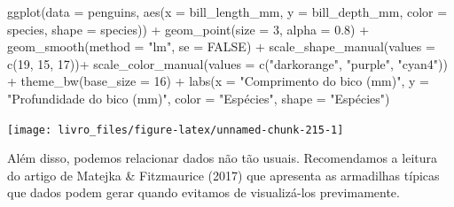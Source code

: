 \documentclass[
]{book}
\newenvironment{Shaded}{\begin{snugshade}}{\end{snugshade}}
\newcommand{\AttributeTok}[1]{\textcolor[rgb]{0.61,0.61,0.61}{#1}}
\newcommand{\ConstantTok}[1]{\textcolor[rgb]{0,0,0}{#1}}
\newcommand{\DecValTok}[1]{\textcolor[rgb]{0.06,0.06,0.06}{#1}}
\newcommand{\FloatTok}[1]{\textcolor[rgb]{0.06,0.06,0.06}{#1}}
\newcommand{\FunctionTok}[1]{\textcolor[rgb]{0,0,0}{#1}}
\newcommand{\NormalTok}[1]{#1}
\newcommand{\SpecialCharTok}[1]{\textcolor[rgb]{0,0,0}{#1}}
\newcommand{\StringTok}[1]{\textcolor[rgb]{0.5,0.5,0.5}{#1}}
\begin{document}
\begin{Shaded}
\begin{Highlighting}[]

\FunctionTok{ggplot}\NormalTok{(}\AttributeTok{data =}\NormalTok{ penguins, }
       \FunctionTok{aes}\NormalTok{(}\AttributeTok{x =}\NormalTok{ bill\_length\_mm, }
           \AttributeTok{y =}\NormalTok{ bill\_depth\_mm,}
           \AttributeTok{color =}\NormalTok{ species,}
           \AttributeTok{shape =}\NormalTok{ species)) }\SpecialCharTok{+}
  \FunctionTok{geom\_point}\NormalTok{(}\AttributeTok{size =} \DecValTok{3}\NormalTok{, }
             \AttributeTok{alpha =} \FloatTok{0.8}\NormalTok{) }\SpecialCharTok{+}
  \FunctionTok{geom\_smooth}\NormalTok{(}\AttributeTok{method =} \StringTok{"lm"}\NormalTok{, }\AttributeTok{se =} \ConstantTok{FALSE}\NormalTok{) }\SpecialCharTok{+}
  \FunctionTok{scale\_shape\_manual}\NormalTok{(}\AttributeTok{values =} \FunctionTok{c}\NormalTok{(}\DecValTok{19}\NormalTok{, }\DecValTok{15}\NormalTok{, }\DecValTok{17}\NormalTok{))}\SpecialCharTok{+}
  \FunctionTok{scale\_color\_manual}\NormalTok{(}\AttributeTok{values =} \FunctionTok{c}\NormalTok{(}\StringTok{"darkorange"}\NormalTok{, }\StringTok{"purple"}\NormalTok{, }\StringTok{"cyan4"}\NormalTok{)) }\SpecialCharTok{+}
  \FunctionTok{theme\_bw}\NormalTok{(}\AttributeTok{base\_size =} \DecValTok{16}\NormalTok{) }\SpecialCharTok{+}
  \FunctionTok{labs}\NormalTok{(}\AttributeTok{x =} \StringTok{"Comprimento do bico (mm)"}\NormalTok{, }\AttributeTok{y =} \StringTok{"Profundidade do bico (mm)"}\NormalTok{, }
       \AttributeTok{color =} \StringTok{"Espécies"}\NormalTok{, }\AttributeTok{shape =} \StringTok{"Espécies"}\NormalTok{)}
\end{Highlighting}
\end{Shaded}

\begin{center}\texttt{[image: livro\_files/figure-latex/unnamed-chunk-215-1]} \end{center}

Além disso, podemos relacionar dados não tão usuais. Recomendamos a leitura do artigo de Matejka \& Fitzmaurice (2017) que apresenta as armadilhas típicas que dados podem gerar quando evitamos de visualizá-los previmamente.
\end{document}
